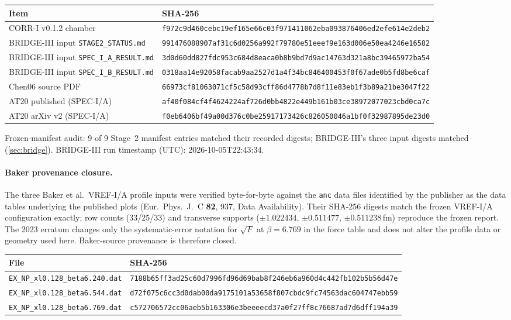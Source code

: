 \documentclass[11pt,a4paper]{article}
\theoremstyle{definition}
\theoremstyle{remark}
\begin{document}
\begin{tabular}{@{}>{\raggedright\arraybackslash}p{4.4cm}l@{}}\toprule Item & SHA-256\\\midrule
CORR-I v0.1.2 chamber & \texttt{\scriptsize f972c9d460cebc19ef165e66c03f971411062eba093876406ed2efe614e2deb2}\\
BRIDGE-III input \texttt{STAGE2\_STATUS.md} & \texttt{\scriptsize 991476088907af31c6d0256a992f79780e51eeef9e163d006e50ea4246e16582} \\
BRIDGE-III input \texttt{SPEC\_I\_A\_RESULT.md} & \texttt{\scriptsize 3d0d60dd827fdc953c684d8eaca0b8b9bd7d9ac14763d321a8bc39465972ba54} \\
BRIDGE-III input \texttt{SPEC\_I\_B\_RESULT.md} & \texttt{\scriptsize 0318aa14e92058facab9aa2527d1a4f34bc846400453f0f67ade0b5fd8be6caf} \\
Chen06 source PDF & \texttt{\scriptsize 66973cf81063071cf5c58d93cff86d4778b7d8f11e83eb1f3b89a21be3047f22}\\
AT20 published (SPEC-I/A) & \texttt{\scriptsize af40f084cf4f4624224af726d0bb4822e449b161b03ce38972077023cbd0ca7c}\\
AT20 arXiv v2 (SPEC-I/A) & \texttt{\scriptsize f0eb6406bf49a00d376c0be25917173426c826050046a1bf0f32987895de23d0}\\
\bottomrule\end{tabular}

\medskip
\noindent Frozen-manifest audit: 9 of 9 Stage~2 manifest entries matched their recorded digests; BRIDGE-III's three input digests matched (\cref{sec:bridge}). BRIDGE-III run timestamp (UTC): 2026-10-05T22:43:34.

\paragraph{Baker provenance closure.} The three Baker et al.\ VREF-I/A profile inputs were verified byte-for-byte against the \texttt{anc} data files identified by the publisher as the data tables underlying the published plots (Eur.\ Phys.\ J.\ C \textbf{82}, 937, Data Availability). Their SHA-256 digests match the frozen VREF-I/A configuration exactly; row counts (33/25/33) and transverse supports ($\pm1.022434$, $\pm0.511477$, $\pm0.511238$\,fm) reproduce the frozen report. The 2023 erratum changes only the systematic-error notation for $\sqrt F$ at $\beta=6.769$ in the force table and does not alter the profile data or geometry used here. Baker-source provenance is therefore closed.

\smallskip\noindent\begin{tabular}{@{}ll@{}}\toprule File & SHA-256\\\midrule
\texttt{EX\_NP\_xl0.128\_beta6.240.dat} & \texttt{\scriptsize 7188b65ff3ad25c60d7996fd96d69bab8f246eb6a960d4c442fb102b5b56d47e}\\
\texttt{EX\_NP\_xl0.128\_beta6.544.dat} & \texttt{\scriptsize d72f075c6cc3d0dab00da9175101a53658f807cbdc9fc74563dac604747ebb59}\\
\texttt{EX\_NP\_xl0.128\_beta6.769.dat} & \texttt{\scriptsize c572706572cc06aeb5b163306e3beeeecd37a0f27ff8c76687ad7d6dff194a39}\\
\bottomrule\end{tabular}
\end{document}
